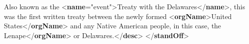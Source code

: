 \begin{shaded}
\hspace*{1em}\hspace*{1em}Also known as the {<\textbf{name}\hspace*{1em}{type}="{event}">}Treaty with the Delawares{</\textbf{name}>}, this was the first written treaty\mbox{}\newline 
\hspace*{1em}\hspace*{1em}\hspace*{1em}\hspace*{1em}\hspace*{1em}\hspace*{1em} between the newly formed {<\textbf{orgName}>}United States{</\textbf{orgName}>} and any Native American people, in this case, the\mbox{}\newline 
\hspace*{1em}\hspace*{1em}Lenape{</\textbf{orgName}>} or Delawares.{</\textbf{desc}>}\mbox{}\newline 
\hspace*{1em}\mbox{}\newline 
{}\mbox{}\newline 
{</\textbf{standOff}>}\end{shaded}\egroup\par 
